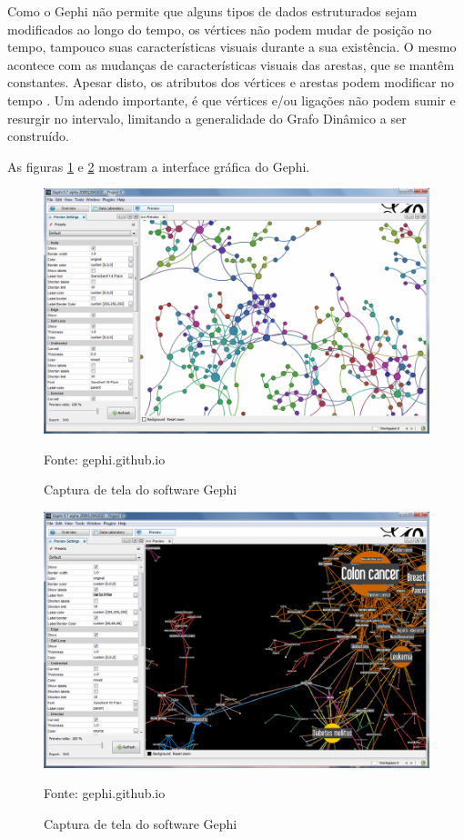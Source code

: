 Como o Gephi não permite que alguns tipos de dados estruturados sejam modificados ao longo do tempo,
os vértices não podem mudar de posição no tempo, tampouco suas características visuais durante a sua existência.
O mesmo acontece com as mudanças de características visuais das arestas, que se mantêm constantes. Apesar
disto, os atributos dos vértices e arestas podem modificar no tempo \cite{dynagraph}. Um adendo importante,
é que vértices e/ou ligações não podem sumir e resurgir no intervalo, limitando a generalidade do Grafo Dinâmico
a ser construído.

As figuras \ref{fig:gephiUm} e \ref{fig:gephiDois} mostram a interface gráfica do Gephi.

\begin{figure}[htbp]
\centering
 \includegraphics[width=.90\textwidth]{chapters/fig/gephiUm.png}
\caption{Captura de tela do software Gephi}
Fonte: gephi.github.io
\label{fig:gephiUm}
\end{figure}

\begin{figure}[htbp]
\centering
 \includegraphics[width=.90\textwidth]{chapters/fig/gephiDois.png}
\caption{Captura de tela do software Gephi}
Fonte: gephi.github.io
\label{fig:gephiDois}
\end{figure}
\FloatBarrier

